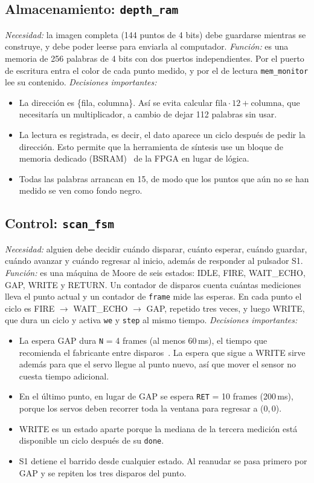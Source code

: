 \documentclass[conference]{IEEEtran}
\newcommand{\mo}[1]{\texttt{#1}}
\begin{document}
\subsection{Almacenamiento: \mo{depth\_ram}}
\emph{Necesidad:} la imagen completa (144 puntos de 4 bits) debe guardarse mientras se construye, y debe poder leerse para enviarla al computador.
\emph{Función:} es una memoria de 256 palabras de 4 bits con dos puertos independientes. Por el puerto de escritura entra el color de cada punto medido, y por el de lectura \mo{mem\_monitor} lee su contenido.
\emph{Decisiones importantes:}
\begin{itemize}
\item La dirección es \{fila, columna\}. Así se evita calcular $\text{fila}\cdot 12 + \text{columna}$, que necesitaría un multiplicador, a cambio de dejar 112 palabras sin usar.
\item La lectura es registrada, es decir, el dato aparece un ciclo después de pedir la dirección. Esto permite que la herramienta de síntesis use un bloque de memoria dedicado (BSRAM)~\cite{bsram} de la FPGA en lugar de lógica.
\item Todas las palabras arrancan en 15, de modo que los puntos que aún no se han medido se ven como fondo negro.
\end{itemize}

\subsection{Control: \mo{scan\_fsm}}
\emph{Necesidad:} alguien debe decidir cuándo disparar, cuánto esperar, cuándo guardar, cuándo avanzar y cuándo regresar al inicio, además de responder al pulsador S1.
\emph{Función:} es una máquina de Moore de seis estados: IDLE, FIRE, WAIT\_ECHO, GAP, WRITE y RETURN. Un contador de disparos cuenta cuántas mediciones lleva el punto actual y un contador de \mo{frame} mide las esperas. En cada punto el ciclo es FIRE $\rightarrow$ WAIT\_ECHO $\rightarrow$ GAP, repetido tres veces, y luego WRITE, que dura un ciclo y activa \mo{we} y \mo{step} al mismo tiempo.
\emph{Decisiones importantes:}
\begin{itemize}
\item La espera GAP dura \mo{N} = 4 frames (al menos 60\,ms), el tiempo que recomienda el fabricante entre disparos~\cite{hcsr04}. La espera que sigue a WRITE sirve además para que el servo llegue al punto nuevo, así que mover el sensor no cuesta tiempo adicional.
\item En el último punto, en lugar de GAP se espera \mo{RET} = 10 frames (200\,ms), porque los servos deben recorrer toda la ventana para regresar a (0,\,0).
\item WRITE es un estado aparte porque la mediana de la tercera medición está disponible un ciclo después de su \mo{done}.
\item S1 detiene el barrido desde cualquier estado. Al reanudar se pasa primero por GAP y se repiten los tres disparos del punto.
\end{itemize}
\end{document}
